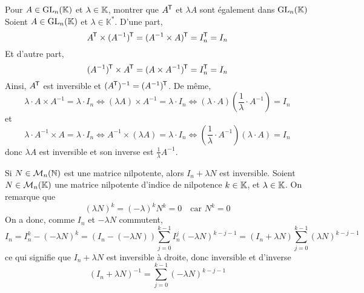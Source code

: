 \documentclass{article}
\renewenvironment{question_kholle}[2][ ]
{
	\subsection{\texorpdfstring{#2}{}}
	\notblank{#1}
	{
		\noindent #1
		\bigbreak
	}
	{}
	\begin{proof}
}
{
	\end{proof}
}
\begin{document}
\begin{question_kholle}
	{Pour $A\in\mathrm{GL}_{n}(\mathbb K)$ et $\lambda\in\mathbb K$, montrer que $A^{\mkern-1.5mu\mathsf{T}}$ et $\lambda A$ sont également dans $\mathrm{GL}_{n}(\mathbb K)$}
	Soient $A \in \mathrm{GL}_n(\mathbb{K})$ et $\lambda \in \mathbb{K}^*$. D’une part,
	\[
		A^{\mkern-1.5mu\mathsf{T}} \times (A^{-1})^{\mkern-1.5mu\mathsf{T}} = (A^{-1} \times  A)^{\mkern-1.5mu\mathsf{T}} = I_{n}^{\mkern-1.5mu\mathsf{T}} = I_{n}
	\]
	Et d’autre part,
	\[
		(A^{-1})^{\mkern-1.5mu\mathsf{T}} \times A^{\mkern-1.5mu\mathsf{T}} = (A \times A^{-1})^{\mkern-1.5mu\mathsf{T}} = I_{n}^{\mkern-1.5mu\mathsf{T}} = I_{n}
	\]
	Ainsi, $A^{\mkern-1.5mu\mathsf{T}}$ est inversible et $(A^{\mkern-1.5mu\mathsf{T}})^{-1}=(A^{-1})^{\mkern-1.5mu\mathsf{T}}$.
	De même,
	\[
		\lambda \cdot A \times A^{-1} = \lambda \cdot I_{n} \iff (\lambda A) \times A^{-1} = \lambda \cdot I_{n} \iff (\lambda \cdot A)\left(\frac{1}{\lambda} \cdot A^{-1}\right) = I_{n}
	\]
	et
	\[
		\lambda \cdot A^{-1} \times A = \lambda \cdot I_{n} \iff A^{-1} \times (\lambda A) = \lambda \cdot I_{n} \iff \left(\frac{1}{\lambda} \cdot A^{-1}\right)(\lambda \cdot A) = I_{n}
	\]
	donc $\lambda A$ est inversible et son inverse est $\displaystyle\frac{1}{\lambda}A^{-1}$.
\end{question_kholle}

\begin{question_kholle}
	{Si $N\in\mathcal{M}_{n}(\mathbb N)$ est une matrice nilpotente, alors $I_n + \lambda N$ est inversible.}
	Soient $N\in\mathcal{M}_{n}(\mathbb K)$ une matrice nilpotente d’indice de nilpotence $k\in\mathbb K$, et $\lambda\in\mathbb K$. On remarque que
	\[
		(\lambda N)^{k} = (-\lambda)^{k}N^{k} = 0 \quad\text{car } N^{k}=0
	\]
	On a donc, comme $I_{n}$ et $-\lambda N$ commutent,
	\[
		I_{n} = I_{n}^{k} - (-\lambda N)^{k} = (I_{n}-(-\lambda N))\sum_{j=0}^{k-1}I_{n}^{j}(-\lambda N)^{k-j-1} = (I_{n}+\lambda N)\sum_{j=0}^{k-1}(\lambda N)^{k-j-1}
	\]
	ce qui signifie que $I_{n}+\lambda N$ est inversible à droite, donc inversible et d’inverse
	\[
		(I_{n} + \lambda N)^{-1} = \sum_{j=0}^{k-1}(-\lambda N)^{k-j-1}
	\]
\end{question_kholle}
\end{document}
